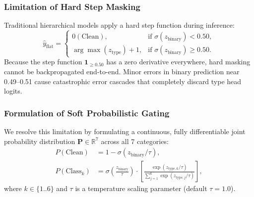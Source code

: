 \documentclass[journal]{IEEEtran}
\begin{document}
\subsubsection{Limitation of Hard Step Masking}
Traditional hierarchical models apply a hard step function during inference:
\begin{equation}
\hat{y}_{\text{flat}} = \begin{cases} 
0 (\text{Clean}), & \text{if } \sigma(z_{\text{binary}}) < 0.50, \\
\arg\max(z_{\text{type}}) + 1, & \text{if } \sigma(z_{\text{binary}}) \ge 0.50.
\end{cases}
\label{eq:hard_mask}
\end{equation}
Because the step function $\mathbf{1}_{\ge 0.50}$ has a zero derivative everywhere, hard masking cannot be backpropagated end-to-end. Minor errors in binary prediction near 0.49--0.51 cause catastrophic error cascades that completely discard type head logits.

\subsubsection{Formulation of Soft Probabilistic Gating}
We resolve this limitation by formulating a continuous, fully differentiable joint probability distribution $\mathbf{P} \in \mathbb{R}^7$ across all 7 categories:
\begin{align}
P(\text{Clean}) &= 1 - \sigma(z_{\text{binary}} / \tau), \label{eq:p_clean} \\
P(\text{Class}_k) &= \sigma\left(\frac{z_{\text{binary}}}{\tau}\right) \cdot \left[ \frac{\exp(z_{\text{type}, k} / \tau)}{\sum_{j=1}^6 \exp(z_{\text{type}, j} / \tau)} \right], \label{eq:p_type}
\end{align}
where $k \in \{1..6\}$ and $\tau$ is a temperature scaling parameter (default $\tau=1.0$). 
\end{document}
